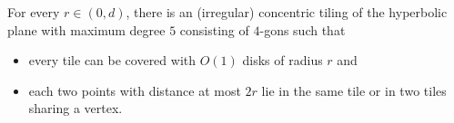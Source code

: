 \documentclass[a4paper,english,cleveref,thm-restate]{lipics-v2021}
\newcommand{\Thomas}[1]{\todo[inline,caption=,backgroundcolor=blue!25]{#1}}
\begin{document}


\begin{lemma}\label{lem:tiling_small_radius}
    For every $ r \in (0, d) $, there is an (irregular) concentric tiling of the hyperbolic plane with maximum degree $ 5 $ consisting of $ 4 $-gons such that
    \begin{itemize}
        \item every tile can be covered with $ O(1) $ disks of radius $ r $ and
        \item each two points with distance at most $ 2r $ lie in the same tile or in two tiles sharing a vertex.
    \end{itemize}

\end{lemma}
\end{document}
